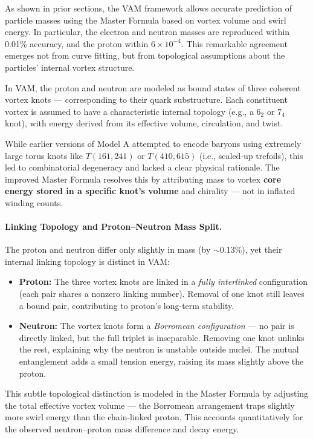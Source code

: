As shown in prior sections, the VAM framework allows accurate prediction of particle masses using the Master Formula based on vortex volume and swirl energy. In particular, the electron and neutron masses are reproduced within 0.01\% accuracy, and the proton within $6 \times 10^{-4}$. This remarkable agreement emerges not from curve fitting, but from topological assumptions about the particles’ internal vortex structure.

In VAM, the proton and neutron are modeled as bound states of three coherent vortex knots — corresponding to their quark substructure. Each constituent vortex is assumed to have a characteristic internal topology (e.g., a $6_2$ or $7_4$ knot), with energy derived from its effective volume, circulation, and twist.

While earlier versions of Model A attempted to encode baryons using extremely large torus knots like $T(161,241)$ or $T(410,615)$ (i.e., scaled-up trefoils), this led to combinatorial degeneracy and lacked a clear physical rationale. The improved Master Formula resolves this by attributing mass to vortex \textbf{core energy stored in a specific knot’s volume} and chirality — not in inflated winding counts.

\paragraph{Linking Topology and Proton–Neutron Mass Split.}

The proton and neutron differ only slightly in mass (by $\sim$0.13\%), yet their internal linking topology is distinct in VAM:

\begin{itemize}
    \item \textbf{Proton:} The three vortex knots are linked in a \emph{fully interlinked} configuration (each pair shares a nonzero linking number). Removal of one knot still leaves a bound pair, contributing to proton’s long-term stability.

    \item \textbf{Neutron:} The vortex knots form a \emph{Borromean configuration} — no pair is directly linked, but the full triplet is inseparable. Removing one knot unlinks the rest, explaining why the neutron is unstable outside nuclei. The mutual entanglement adds a small tension energy, raising its mass slightly above the proton.
\end{itemize}

This subtle topological distinction is modeled in the Master Formula by adjusting the total effective vortex volume — the Borromean arrangement traps slightly more swirl energy than the chain-linked proton. This accounts quantitatively for the observed neutron–proton mass difference and decay energy.

